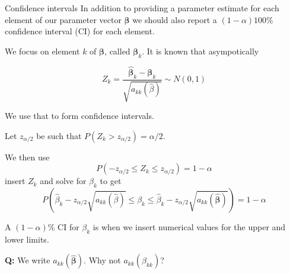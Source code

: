 \documentclass[
  ignorenonframetext,
]{beamer}
\begin{document}
\begin{frame}
\begin{block}{Confidence intervals}
\protect\hypertarget{confidence-intervals}{}
In addition to providing a parameter estimate for each element of our
parameter vector \(\boldsymbol{\beta}\) we should also report a
\((1-\alpha)100\)\% confidence interval (CI) for each element.

We focus on element \(k\) of \(\boldsymbol{\beta}\), called
\(\boldsymbol{\beta}_k\). It is known that asympotically

\[
Z_k=\frac{\hat{\boldsymbol{\beta}}_k-\boldsymbol{\beta}_k}{\sqrt{{a}_{kk}(\hat{\beta})}} \sim N(0,1)
\]

We use that to form confidence intervals.

Let \(z_{\alpha/2}\) be such that \(P(Z_k>z_{\alpha/2})=\alpha/2\).
\end{block}
\end{frame}

\begin{frame}
We then use \[ P(-z_{\alpha/2}\le Z_k \le z_{\alpha/2})=1-\alpha\]
insert \(Z_k\) and solve for \(\beta_k\) to get
\[ P(\hat{\beta}_k-z_{\alpha/2}\sqrt{a_{kk}(\hat{\beta})}
\le \beta_k \le \hat{\beta}_k-z_{\alpha/2}\sqrt{a_{kk}(\hat{\boldsymbol{\beta}})})=1-\alpha\]

A \((1-\alpha)\)\% CI for \(\beta_k\) is when we insert numerical values
for the upper and lower limits.

\textbf{Q:} We write \(a_{kk}(\hat{\boldsymbol{\beta}})\). Why not
\(a_{kk}(\hat{\beta}_{kk})\)?
\end{frame}
\end{document}
